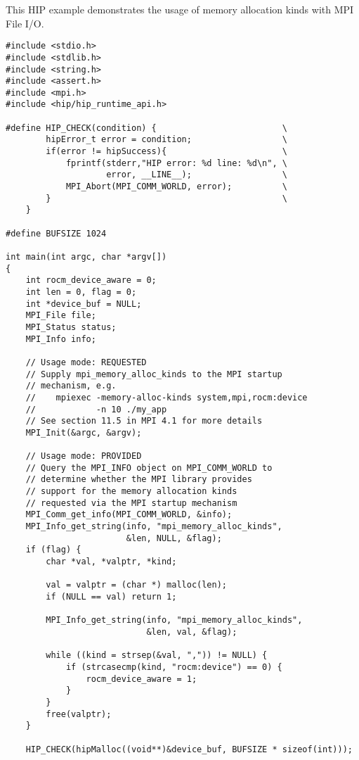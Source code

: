 \begin{example}
\label{example:alloc-kind-wpm-hip}
This HIP example demonstrates the usage of memory
allocation kinds with MPI File I/O. 

\begin{lstlisting}[language={[MPI]C}]
#include <stdio.h>
#include <stdlib.h>
#include <string.h>
#include <assert.h>
#include <mpi.h>
#include <hip/hip_runtime_api.h>

#define HIP_CHECK(condition) {                         \
        hipError_t error = condition;                  \
        if(error != hipSuccess){                       \
            fprintf(stderr,"HIP error: %d line: %d\n", \
                    error, __LINE__);                  \
            MPI_Abort(MPI_COMM_WORLD, error);          \
        }                                              \
    }

#define BUFSIZE 1024

int main(int argc, char *argv[])
{
    int rocm_device_aware = 0;
    int len = 0, flag = 0;
    int *device_buf = NULL;
    MPI_File file;
    MPI_Status status;
    MPI_Info info;

    // Usage mode: REQUESTED
    // Supply mpi_memory_alloc_kinds to the MPI startup
    // mechanism, e.g.
    //    mpiexec -memory-alloc-kinds system,mpi,rocm:device
    //            -n 10 ./my_app
    // See section 11.5 in MPI 4.1 for more details
    MPI_Init(&argc, &argv);

    // Usage mode: PROVIDED
    // Query the MPI_INFO object on MPI_COMM_WORLD to
    // determine whether the MPI library provides 
    // support for the memory allocation kinds 
    // requested via the MPI startup mechanism
    MPI_Comm_get_info(MPI_COMM_WORLD, &info);
    MPI_Info_get_string(info, "mpi_memory_alloc_kinds",
                        &len, NULL, &flag);
    if (flag) {
        char *val, *valptr, *kind;

        val = valptr = (char *) malloc(len);
        if (NULL == val) return 1;

        MPI_Info_get_string(info, "mpi_memory_alloc_kinds",
                            &len, val, &flag);

        while ((kind = strsep(&val, ",")) != NULL) {
            if (strcasecmp(kind, "rocm:device") == 0) {
                rocm_device_aware = 1;
            }
        }
        free(valptr);
    }

    HIP_CHECK(hipMalloc((void**)&device_buf, BUFSIZE * sizeof(int)));


\end{lstlisting}
\end{example}

